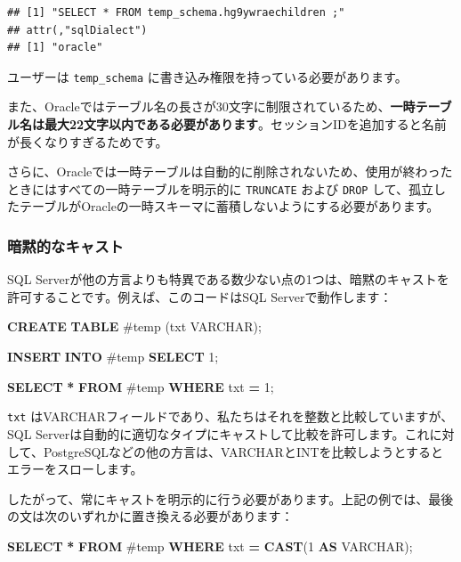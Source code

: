 \documentclass[
  11pt]{book}
\newenvironment{Shaded}{\begin{snugshade}}{\end{snugshade}}
\newcommand{\DataTypeTok}[1]{\textcolor[rgb]{0.13,0.29,0.53}{#1}}
\newcommand{\DecValTok}[1]{\textcolor[rgb]{0.00,0.00,0.81}{#1}}
\newcommand{\FunctionTok}[1]{\textcolor[rgb]{0.13,0.29,0.53}{\textbf{#1}}}
\newcommand{\KeywordTok}[1]{\textcolor[rgb]{0.13,0.29,0.53}{\textbf{#1}}}
\newcommand{\NormalTok}[1]{#1}
\newcommand{\OperatorTok}[1]{\textcolor[rgb]{0.81,0.36,0.00}{\textbf{#1}}}
\newcommand{\StringTok}[1]{\textcolor[rgb]{0.31,0.60,0.02}{#1}}
\theoremstyle{definition}
\theoremstyle{definition}
\theoremstyle{definition}
\theoremstyle{definition}
\theoremstyle{remark}
\begin{document}
\begin{verbatim}
## [1] "SELECT * FROM temp_schema.hg9ywraechildren ;"
## attr(,"sqlDialect")
## [1] "oracle"
\end{verbatim}

ユーザーは \texttt{temp\_schema} に書き込み権限を持っている必要があります。

また、Oracleではテーブル名の長さが30文字に制限されているため、\textbf{一時テーブル名は最大22文字以内である必要があります}。セッションIDを追加すると名前が長くなりすぎるためです。

さらに、Oracleでは一時テーブルは自動的に削除されないため、使用が終わったときにはすべての一時テーブルを明示的に \texttt{TRUNCATE} および \texttt{DROP} して、孤立したテーブルがOracleの一時スキーマに蓄積しないようにする必要があります。

\subsubsection*{暗黙的なキャスト}\label{ux6697ux9ed9ux7684ux306aux30adux30e3ux30b9ux30c8}

SQL Serverが他の方言よりも特異である数少ない点の1つは、暗黙のキャストを許可することです。例えば、このコードはSQL Serverで動作します：

\begin{Shaded}
\begin{Highlighting}[]
\KeywordTok{CREATE} \KeywordTok{TABLE}\NormalTok{ \#temp (txt }\DataTypeTok{VARCHAR}\NormalTok{);}

\KeywordTok{INSERT} \KeywordTok{INTO}\NormalTok{ \#temp}
\KeywordTok{SELECT} \StringTok{\textquotesingle{}1\textquotesingle{}}\NormalTok{;}

\KeywordTok{SELECT} \OperatorTok{*} \KeywordTok{FROM}\NormalTok{ \#temp }\KeywordTok{WHERE}\NormalTok{ txt }\OperatorTok{=} \DecValTok{1}\NormalTok{;}
\end{Highlighting}
\end{Shaded}

\texttt{txt} はVARCHARフィールドであり、私たちはそれを整数と比較していますが、SQL Serverは自動的に適切なタイプにキャストして比較を許可します。これに対して、PostgreSQLなどの他の方言は、VARCHARとINTを比較しようとするとエラーをスローします。

したがって、常にキャストを明示的に行う必要があります。上記の例では、最後の文は次のいずれかに置き換える必要があります：

\begin{Shaded}
\begin{Highlighting}[]
\KeywordTok{SELECT} \OperatorTok{*} \KeywordTok{FROM}\NormalTok{ \#temp }\KeywordTok{WHERE}\NormalTok{ txt }\OperatorTok{=} \FunctionTok{CAST}\NormalTok{(}\DecValTok{1} \KeywordTok{AS} \DataTypeTok{VARCHAR}\NormalTok{);}
\end{Highlighting}
\end{Shaded}
\end{document}
